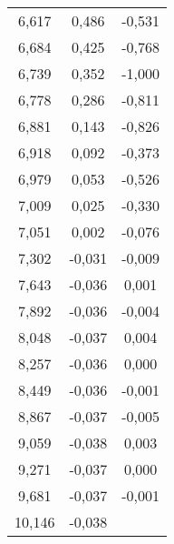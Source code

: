 \begin{longtable}{c c c}
	6,617&0,486&-0,531 \\
	6,684&0,425&-0,768 \\
	6,739&0,352&-1,000 \\
	6,778&0,286&-0,811 \\
	6,881&0,143&-0,826 \\
	6,918&0,092&-0,373 \\
	6,979&0,053&-0,526 \\
	7,009&0,025&-0,330 \\
	7,051&0,002&-0,076 \\
	7,302&-0,031&-0,009 \\
	7,643&-0,036&0,001 \\
	7,892&-0,036&-0,004 \\
	8,048&-0,037&0,004 \\
	8,257&-0,036&0,000 \\
	8,449&-0,036&-0,001 \\
	8,867&-0,037&-0,005 \\
	9,059&-0,038&0,003 \\
	9,271&-0,037&0,000 \\
	9,681&-0,037&-0,001 \\
	10,146&-0,038& \\
\end{longtable}

